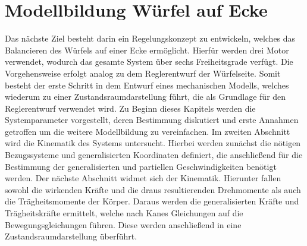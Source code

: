 \chapter{Modellbildung Würfel auf Ecke}
Das nächste Ziel besteht darin ein Regelungskonzept zu entwickeln, welches das Balancieren des Würfels auf einer Ecke ermöglicht. Hierfür werden drei Motor verwendet, wodurch das gesamte System über sechs Freiheitsgrade verfügt. Die Vorgehensweise erfolgt analog zu dem Reglerentwurf der Würfelseite. Somit besteht der erste Schritt in dem Entwurf eines mechanischen Modells, welches wiederum zu einer Zustandsraumdarstellung führt, die als Grundlage für den Reglerentwurf verwendet wird.
Zu Beginn dieses Kapitels werden die Systemparameter vorgestellt, deren Bestimmung diskutiert und erste Annahmen getroffen um die weitere Modellbildung zu vereinfachen. Im zweiten Abschnitt wird die Kinematik des Systems untersucht. Hierbei werden zunächst die nötigen Bezugssysteme und generalisierten Koordinaten definiert, die anschließend für die Bestimmung der generalisierten und partiellen Geschwindigkeiten benötigt werden.
Der nächste Abschnitt widmet sich der Kinematik. Hierunter fallen sowohl die wirkenden Kräfte und die draus resultierenden Drehmomente als auch die Trägheitsmomente der Körper. Daraus werden die generalisierten Kräfte und Trägheitskräfte ermittelt, welche nach Kanes Gleichungen auf die Bewegungsgleichungen führen. Diese werden anschließend in eine Zustandsraumdarstellung überführt.

